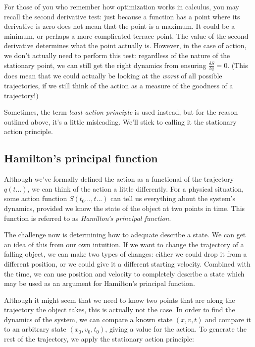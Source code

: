 For those of you who remember how optimization works in calculus, you may recall the second
derivative test: just because a function has a point where its derivative is zero does not mean
that the point is a maximum. It could be a minimum, or perhaps a more complicated terrace point.
The value of the second derivative determines what the point actually is. However, in the case of
action, we don't actually need to perform this test: regardless of the nature of the stationary
point, we can still get the right dynamics from ensuring $\frac{\delta S}{\delta q} = 0$. (This
does mean that we could actually be looking at the \textit{worst} of all possible trajectories, if
we still think of the action as a measure of the goodness of a trajectory!)

Sometimes, the term \textit{least action principle} is used instead, but for the reason outlined
above, it's a little misleading. We'll stick to calling it the stationary action principle.

\subsection{Hamilton's principal function}

Although we've formally defined the action as a functional of the trajectory $q\left(t...\right)$,
we can think of the action a little differently. For a physical situation, some action function
$S\left(t_0..., t...\right)$ can tell us everything about the system's dynamics, provided we know
the state of the object at two points in time. This function is referred to as \textit{Hamilton's
principal function}. 

The challenge now is determining how to adequate describe a state. We can get an idea of this from
our own intuition. If we want to change the trajectory of a falling object, we can make two types
of changes: either we could drop it from a different position, or we could give it a different
starting velocity. Combined with the time, we can use position and velocity to completely describe
a state which may be used as an argument for Hamilton's principal function.

Although it might seem that we need to know two points that are along the trajectory the object
takes, this is actually not the case. In order to find the dynamics of the system, we can compare
a known state $(x,v,t)$ and compare it to an arbitrary state $(x_0,v_0,t_0)$, giving a value for
the action. To generate the rest of the trajectory, we apply the stationary action principle:

